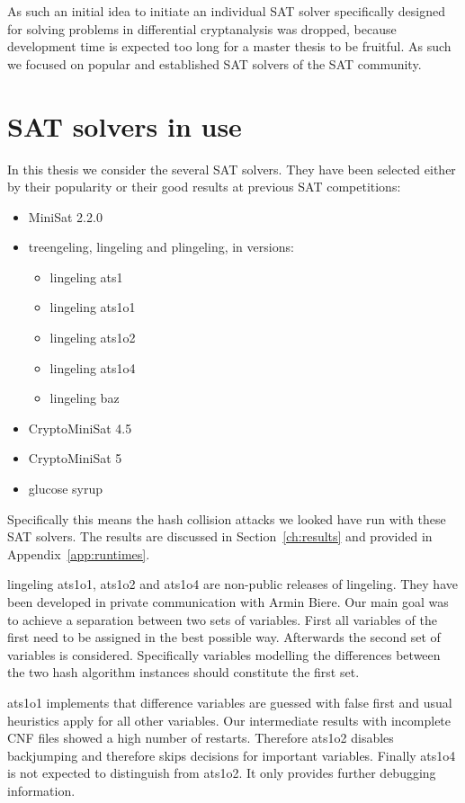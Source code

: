 As such an initial idea to initiate an individual SAT solver specifically designed for
solving problems in differential cryptanalysis was dropped, because development time
is expected too long for a master thesis to be fruitful. As such we focused on popular
and established SAT solvers of the SAT community.

\section{SAT solvers in use}
\label{sec:sat-solvers}
%
In this thesis we consider the several SAT solvers.
They have been selected either by their popularity
or their good results at previous SAT competitions:
\begin{itemize}
  \item MiniSat 2.2.0
  \item treengeling, lingeling and plingeling, in versions:
    \begin{itemize}
      \item lingeling ats1
      \item lingeling ats1o1
      \item lingeling ats1o2
      \item lingeling ats1o4
      \item lingeling baz
    \end{itemize}
  \item CryptoMiniSat 4.5
  \item CryptoMiniSat 5
  \item glucose syrup
\end{itemize}

Specifically this means the hash collision attacks we looked have run with
these SAT solvers. The results are discussed in Section~\ref{ch:results}
and provided in Appendix~\ref{app:runtimes}.

lingeling ats1o1, ats1o2 and ats1o4 are non-public releases of lingeling.
They have been developed in private communication with Armin Biere.
Our main goal was to achieve a separation between two sets of variables.
First all variables of the first need to be assigned in the best possible
way. Afterwards the second set of variables is considered.
Specifically variables modelling the differences between the two hash
algorithm instances should constitute the first set.

ats1o1 implements that difference variables are guessed with false first and
usual heuristics apply for all other variables.
Our intermediate results with incomplete CNF files showed a high number of restarts.
Therefore ats1o2 disables backjumping and therefore skips decisions for important variables.
Finally ats1o4 is not expected to distinguish from ats1o2. It only provides further debugging information.

